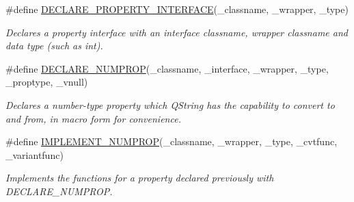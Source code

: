 \begin{DoxyCompactItemize}
\#define \hyperlink{group___property_classes_gaac09fb32e07282e79330aeb7cfc9e5eb}{D\-E\-C\-L\-A\-R\-E\-\_\-\-P\-R\-O\-P\-E\-R\-T\-Y\-\_\-\-I\-N\-T\-E\-R\-F\-A\-C\-E}(\-\_\-classname, \-\_\-wrapper, \-\_\-type)
\begin{DoxyCompactList}\small\item\em Declares a property interface with an interface classname, wrapper classname and data type (such as int). \end{DoxyCompactList}\item 
\#define \hyperlink{group___property_classes_ga9b75216621cf38585610f12ce907d01c}{D\-E\-C\-L\-A\-R\-E\-\_\-\-N\-U\-M\-P\-R\-O\-P}(\-\_\-classname, \-\_\-interface, \-\_\-wrapper, \-\_\-type, \-\_\-proptype, \-\_\-vnull)
\begin{DoxyCompactList}\small\item\em Declares a number-\/type property which Q\-String has the capability to convert to and from, in macro form for convenience. \end{DoxyCompactList}\item 
\#define \hyperlink{group___property_classes_gae16b8183fbdf59c5bf8809835a2617e5}{I\-M\-P\-L\-E\-M\-E\-N\-T\-\_\-\-N\-U\-M\-P\-R\-O\-P}(\-\_\-classname, \-\_\-wrapper, \-\_\-type, \-\_\-cvtfunc, \-\_\-variantfunc)
\begin{DoxyCompactList}\small\item\em Implements the functions for a property declared previously with D\-E\-C\-L\-A\-R\-E\-\_\-\-N\-U\-M\-P\-R\-O\-P. \end{DoxyCompactList}\end{DoxyCompactItemize}
